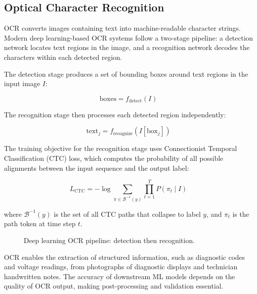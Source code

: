 \documentclass[10pt,a4paper]{article}
\begin{document}
\subsection{Optical Character Recognition}
\label{sec:ocr-deep-learning}

OCR converts images containing text into machine-readable character strings. Modern deep learning-based OCR systems follow a two-stage pipeline: a detection network locates text regions in the image, and a recognition network decodes the characters within each detected region.

The detection stage produces a set of bounding boxes around text regions in the input image $I$:

\begin{equation}
\text{boxes} = f_{\text{detect}}(I)
\label{eq:ocr-detection}
\end{equation}

The recognition stage then processes each detected region independently:

\begin{equation}
\text{text}_j = f_{\text{recognize}}(I[\text{box}_j])
\label{eq:ocr-recognition}
\end{equation}

The training objective for the recognition stage uses Connectionist Temporal Classification (CTC) loss, which computes the probability of all possible alignments between the input sequence and the output label:

\begin{equation}
L_{\text{CTC}} = -\log \sum_{\pi \in \mathcal{B}^{-1}(y)} \prod_{t=1}^{T} P(\pi_t \mid I)
\label{eq:ctc-loss}
\end{equation}

where $\mathcal{B}^{-1}(y)$ is the set of all CTC paths that collapse to label $y$, and $\pi_t$ is the path token at time step $t$.

\begin{figure}[H]
    \centering
    \caption{Deep learning OCR pipeline: detection then recognition.}
    \label{fig:ocr-pipeline}
\end{figure}

OCR enables the extraction of structured information, such as diagnostic codes and voltage readings, from photographs of diagnostic displays and technician handwritten notes. The accuracy of downstream ML models depends on the quality of OCR output, making post-processing and validation essential.
\end{document}
